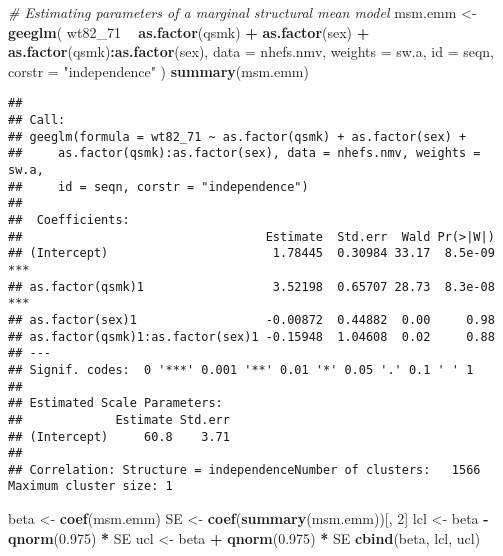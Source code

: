 \documentclass[10pt,]{book}
\newenvironment{Shaded}{\begin{snugshade}}{\end{snugshade}}
\newcommand{\CommentTok}[1]{\textcolor[rgb]{0.56,0.35,0.01}{\textit{#1}}}
\newcommand{\DataTypeTok}[1]{\textcolor[rgb]{0.13,0.29,0.53}{#1}}
\newcommand{\DecValTok}[1]{\textcolor[rgb]{0.00,0.00,0.81}{#1}}
\newcommand{\FloatTok}[1]{\textcolor[rgb]{0.00,0.00,0.81}{#1}}
\newcommand{\KeywordTok}[1]{\textcolor[rgb]{0.13,0.29,0.53}{\textbf{#1}}}
\newcommand{\NormalTok}[1]{#1}
\newcommand{\OperatorTok}[1]{\textcolor[rgb]{0.81,0.36,0.00}{\textbf{#1}}}
\newcommand{\StringTok}[1]{\textcolor[rgb]{0.31,0.60,0.02}{#1}}
\begin{document}
\begin{Shaded}
\begin{Highlighting}[]
\CommentTok{# Estimating parameters of a marginal structural mean model}
\NormalTok{msm.emm <-}\StringTok{ }\KeywordTok{geeglm}\NormalTok{(}
\NormalTok{  wt82_}\DecValTok{71} \OperatorTok{~}\StringTok{ }\KeywordTok{as.factor}\NormalTok{(qsmk) }\OperatorTok{+}\StringTok{ }\KeywordTok{as.factor}\NormalTok{(sex)}
  \OperatorTok{+}\StringTok{ }\KeywordTok{as.factor}\NormalTok{(qsmk)}\OperatorTok{:}\KeywordTok{as.factor}\NormalTok{(sex),}
  \DataTypeTok{data =}\NormalTok{ nhefs.nmv,}
  \DataTypeTok{weights =}\NormalTok{ sw.a,}
  \DataTypeTok{id =}\NormalTok{ seqn,}
  \DataTypeTok{corstr =} \StringTok{"independence"}
\NormalTok{)}
\KeywordTok{summary}\NormalTok{(msm.emm)}
\end{Highlighting}
\end{Shaded}

\begin{verbatim}
## 
## Call:
## geeglm(formula = wt82_71 ~ as.factor(qsmk) + as.factor(sex) + 
##     as.factor(qsmk):as.factor(sex), data = nhefs.nmv, weights = sw.a, 
##     id = seqn, corstr = "independence")
## 
##  Coefficients:
##                                  Estimate  Std.err  Wald Pr(>|W|)    
## (Intercept)                       1.78445  0.30984 33.17  8.5e-09 ***
## as.factor(qsmk)1                  3.52198  0.65707 28.73  8.3e-08 ***
## as.factor(sex)1                  -0.00872  0.44882  0.00     0.98    
## as.factor(qsmk)1:as.factor(sex)1 -0.15948  1.04608  0.02     0.88    
## ---
## Signif. codes:  0 '***' 0.001 '**' 0.01 '*' 0.05 '.' 0.1 ' ' 1
## 
## Estimated Scale Parameters:
##             Estimate Std.err
## (Intercept)     60.8    3.71
## 
## Correlation: Structure = independenceNumber of clusters:   1566   Maximum cluster size: 1
\end{verbatim}

\begin{Shaded}
\begin{Highlighting}[]
\NormalTok{beta <-}\StringTok{ }\KeywordTok{coef}\NormalTok{(msm.emm)}
\NormalTok{SE <-}\StringTok{ }\KeywordTok{coef}\NormalTok{(}\KeywordTok{summary}\NormalTok{(msm.emm))[, }\DecValTok{2}\NormalTok{]}
\NormalTok{lcl <-}\StringTok{ }\NormalTok{beta }\OperatorTok{-}\StringTok{ }\KeywordTok{qnorm}\NormalTok{(}\FloatTok{0.975}\NormalTok{) }\OperatorTok{*}\StringTok{ }\NormalTok{SE}
\NormalTok{ucl <-}\StringTok{ }\NormalTok{beta }\OperatorTok{+}\StringTok{ }\KeywordTok{qnorm}\NormalTok{(}\FloatTok{0.975}\NormalTok{) }\OperatorTok{*}\StringTok{ }\NormalTok{SE}
\KeywordTok{cbind}\NormalTok{(beta, lcl, ucl)}
\end{Highlighting}
\end{Shaded}
\end{document}
